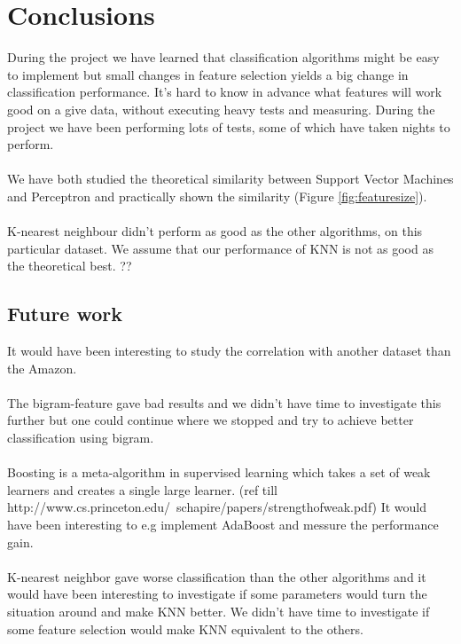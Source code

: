 \chapter{Conclusions}
During the project we have learned that classification algorithms might be easy to implement but small changes in feature selection yields a big change in classification performance. It's hard to know in advance what features will work good on a give data, without executing heavy tests and measuring. During the project we have been performing lots of tests, some of which have taken nights to perform. 
\\\\
We have both studied the theoretical similarity between Support Vector Machines and Perceptron and practically shown the similarity (Figure \ref{fig:featuresize}).
\\\\
K-nearest neighbour didn't perform as good as the other algorithms, on this particular dataset. We assume that our performance of KNN is not as good as the theoretical best. ??  
\section{Future work}
It would have been interesting to study the correlation with another dataset than the Amazon.  \\\\
The bigram-feature gave bad results and we didn't have time to investigate this further but one could continue where we stopped and try to achieve better classification using bigram. \\\\
Boosting is a meta-algorithm in supervised learning which takes a set of weak learners and creates a single large learner. (ref till http://www.cs.princeton.edu/~schapire/papers/strengthofweak.pdf) It would have been interesting to e.g implement AdaBoost and messure the performance gain. \\\\
K-nearest neighbor gave worse classification than the other algorithms and it would have been interesting to investigate if some parameters would turn the situation around and make KNN better. We didn't have time to investigate if some feature selection would make KNN equivalent to the others.
